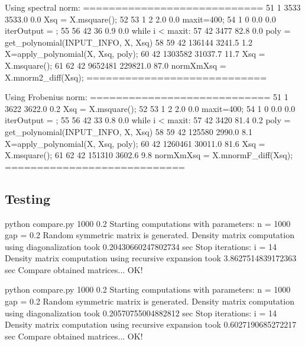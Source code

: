 \documentclass{amsart}
\begin{document}
Using spectral norm:
============================
51         1         3533   3533.0      0.0      Xsq = X.msquare();
52                                           
53         1            2      2.0      0.0      maxit=400;
54         1            0      0.0      0.0      iterOutput = {};
55                                               
56        42           36      0.9      0.0      while i < maxit:
57        42         3477     82.8      0.0          poly = get_polynomial(INPUT_INFO, X, Xsq)
58                                                   
59        42       136144   3241.5      1.2          X=apply_polynomial(X, Xsq, poly);
60        42      1303582  31037.7     11.7          Xsq = X.msquare();
61                                                   
62        42      9652481 229821.0     87.0          normXmXsq = X.mnorm2_diff(Xsq);
============================

Using Frobenius norm:
============================
51         1         3622   3622.0      0.2      Xsq = X.msquare();
52                                           
53         1            2      2.0      0.0      maxit=400;
54         1            0      0.0      0.0      iterOutput = {};
55                                               
56        42           33      0.8      0.0      while i < maxit:
57        42         3420     81.4      0.2          poly = get_polynomial(INPUT_INFO, X, Xsq)
58                                                   
59        42       125580   2990.0      8.1          X=apply_polynomial(X, Xsq, poly);
60        42      1260461  30011.0     81.6          Xsq = X.msquare();
61                                                   
62        42       151310   3602.6      9.8          normXmXsq = X.mnormF_diff(Xsq);
============================


\subsection{Testing}

python compare.py 1000 0.2
Starting computations with parameters:
  n    = 1000 
  gap = 0.2 
Random symmetric matrix is generated.
Density matrix computation using diagonalization took 0.20430660247802734 sec
Stop iterations: i = 14
Density matrix computation using recursive expansion took 3.8627514839172363 sec
Compare obtained matrices...
OK!


python compare.py 1000 0.2
Starting computations with parameters:
  n    = 1000 
  gap = 0.2 
Random symmetric matrix is generated.
Density matrix computation using diagonalization took 0.20570755004882812 sec
Stop iterations: i = 14
Density matrix computation using recursive expansion took 0.6027190685272217 sec
Compare obtained matrices...
OK!
\end{document}
